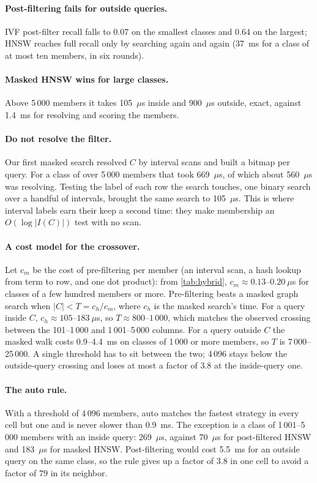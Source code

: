 \documentclass[sigconf, nonacm]{acmart}
\begin{document}
\paragraph{Post-filtering fails for outside queries.} IVF post-filter recall falls to 0.07 on the smallest classes and 0.64 on the largest; HNSW reaches full recall only by searching again and again (37~ms for a class of at most ten members, in six rounds).

\paragraph{Masked HNSW wins for large classes.} Above 5\,000 members it takes 105~$\mu$s inside and 900~$\mu$s outside, exact, against 1.4~ms for resolving and scoring the members.

\paragraph{Do not resolve the filter.} Our first masked search resolved $C$ by interval scans and built a bitmap per query. For a class of over 5\,000 members that took 669~$\mu$s, of which about 560~$\mu$s was resolving. Testing the label of each row the search touches, one binary search over a handful of intervals, brought the same search to 105~$\mu$s. This is where interval labels earn their keep a second time: they make membership an $O(\log|I(C)|)$ test with no scan.

\paragraph{A cost model for the crossover.} Let $c_m$ be the cost of pre-filtering per member (an interval scan, a hash lookup from term to row, and one dot product): from \autoref{tab:hybrid}, $c_m\approx 0.13$--$0.20~\mu$s for classes of a few hundred members or more. Pre-filtering beats a masked graph search when $|C|<T=c_h/c_m$, where $c_h$ is the masked search's time. For a query inside $C$, $c_h\approx 105$--$183~\mu$s, so $T\approx 800$--$1\,000$, which matches the observed crossing between the 101--1\,000 and 1\,001--5\,000 columns. For a query outside $C$ the masked walk costs 0.9--4.4~ms on classes of 1\,000 or more members, so $T$ is 7\,000--25\,000. A single threshold has to sit between the two; 4\,096 stays below the outside-query crossing and loses at most a factor of 3.8 at the inside-query one.

\paragraph{The auto rule.} With a threshold of 4\,096 members, auto matches the fastest strategy in every cell but one and is never slower than 0.9~ms. The exception is a class of 1\,001--5\,000 members with an inside query: 269~$\mu$s, against 70~$\mu$s for post-filtered HNSW and 183~$\mu$s for masked HNSW. Post-filtering would cost 5.5~ms for an outside query on the same class, so the rule gives up a factor of 3.8 in one cell to avoid a factor of 79 in its neighbor.
\end{document}
